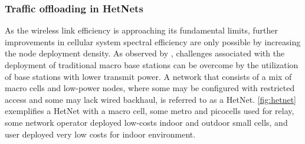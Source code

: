 



\subsubsection{Traffic offloading in \acsp{HetNet}}
\label{subsec:heterogeneous}

As the wireless link efficiency is approaching its fundamental limits, further
improvements in cellular system spectral efficiency are only possible by
increasing the node deployment density. As observed by \citet{Damnjanovic2011},
challenges associated with the deployment of traditional macro base stations
can be overcome by the utilization of base stations with lower transmit power.
A network that consists of a mix of macro cells and low-power nodes, where some
may be configured with restricted access and some may lack wired backhaul, is
referred to as a \acf{HetNet}. \autoref{fig:hetnet} exemplifies a \ac{HetNet}
with a macro cell, some metro and picocells used for relay, some network
operator deployed low-costs indoor and outdoor small cells, and user deployed
very low costs for indoor environment.

